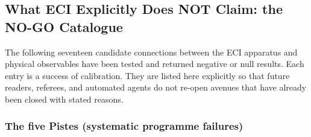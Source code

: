 \subsection{What ECI Explicitly Does NOT Claim: the NO-GO Catalogue}
\label{subsec:nogo}

The following seventeen candidate connections between the ECI apparatus and
physical observables have been tested and returned negative or null results.
Each entry is a success of calibration.  They are listed here explicitly so
that future readers, referees, and automated agents do not re-open avenues
that have already been closed with stated reasons.

\subsubsection*{The five Pistes (systematic programme failures)}

